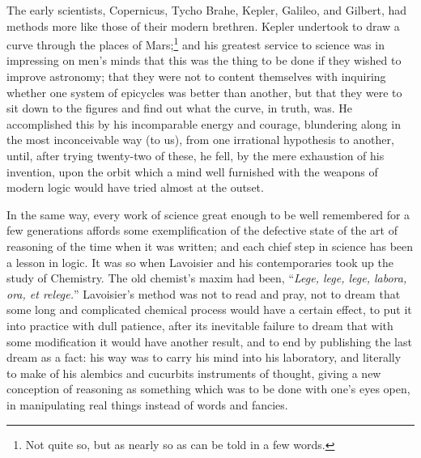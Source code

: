 The early scientists, Copernicus, Tycho Brahe, Kepler, Galileo, and
Gilbert, had methods more like those of their modern brethren. Kepler
undertook to draw a curve through the places of Mars;\footnote{Not
quite so, but as nearly so as can be told in a few words.} and his
greatest service to science was in impressing on men's minds that this
was the thing to be done if they wished to improve astronomy; that
they were not to content themselves with inquiring whether one system
of epicycles was better than another, but that they were to sit down
to the figures and find out what the curve, in truth, was. He
accomplished this by his incomparable energy and courage, blundering
along in the most inconceivable way (to us), from one irrational
hypothesis to another, until, after trying twenty-two of these, he
fell, by the mere exhaustion of his invention, upon the orbit which a
mind well furnished with the weapons of modern logic would have tried
almost at the outset.

In the same way, every work of science great enough to be well
remembered for a few generations affords some exemplification of the
defective state of the art of reasoning of the time when it was
written; and each chief step in science has been a lesson in logic. It
was so when Lavoisier and his contemporaries took up the study of
Chemistry. The old chemist's maxim had been, ``\textit{Lege, lege,
lege, labora, ora, et relege.}'' Lavoisier's method was not to read
and pray, not to dream that some long and complicated chemical process
would have a certain effect, to put it into practice with dull
patience, after its inevitable failure to dream that with some
modification it would have another result, and to end by publishing
the last dream as a fact: his way was to carry his mind into his
laboratory, and literally to make of his alembics and cucurbits
instruments of thought, giving a new conception of reasoning as
something which was to be done with one's eyes open, in manipulating
real things instead of words and fancies.

